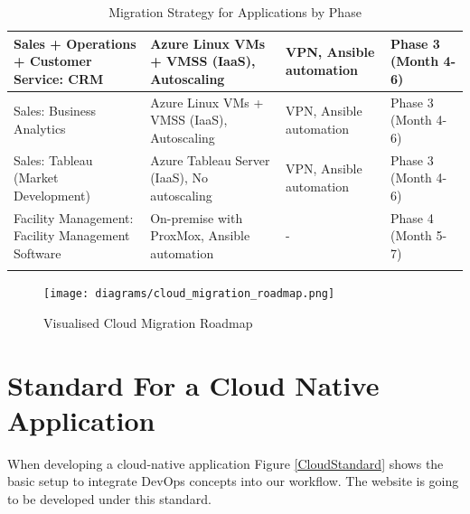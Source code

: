 \documentclass{llncs}
\begin{document}
\begin{longtable}{|p{3.1cm}|p{5.2cm}|p{3.1cm}|l|}
    \hline
    Sales + Operations + Customer Service: CRM        & Azure Linux VMs + VMSS (IaaS), Autoscaling                                                                   & VPN, Ansible automation                                    & Phase 3 (Month 4-6)  \\
    \hline
    Sales: Business Analytics                         & Azure Linux VMs + VMSS (IaaS), Autoscaling                                                                   & VPN, Ansible automation                                    & Phase 3 (Month 4-6)  \\
    \hline
    Sales: Tableau (Market Development)               & Azure Tableau Server (IaaS), No autoscaling                                                                  & VPN, Ansible automation                                    & Phase 3 (Month 4-6)  \\
    \hline
    Facility Management: Facility Management Software & On-premise with ProxMox, Ansible automation                                                                  & -                                                          & Phase 4 (Month 5-7)  \\
    \hline
    \caption{Migration Strategy for Applications by Phase}
\end{longtable}

\newpage

\begin{figure}[htbp]
    \begin{center}
        \texttt{[image: diagrams/cloud\_migration\_roadmap.png]}
        \vspace{0.01\textwidth}
        \caption{Visualised Cloud Migration Roadmap}
        \label{cloud migration roadmap} %
    \end{center}
\end{figure}


\section{Standard For a Cloud Native Application}

When developing a cloud-native application Figure \ref{CloudStandard} shows the basic setup to integrate DevOps concepts into our workflow.
The website is going to be developed under this standard.\\
\end{document}
